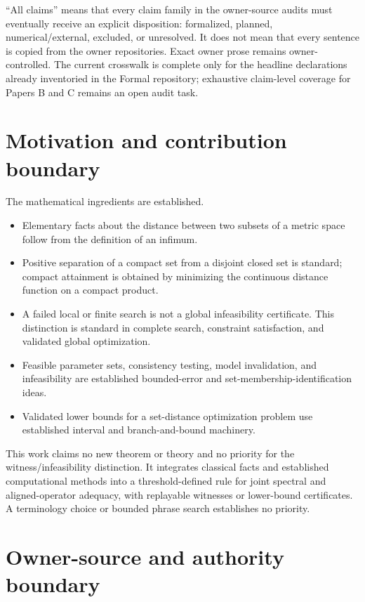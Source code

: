 \documentclass[11pt]{article}
\begin{document}
``All claims'' means that every claim family in the owner-source audits must eventually
receive an explicit disposition: formalized, planned, numerical/external, excluded, or
unresolved. It does not mean that every sentence is copied from the owner repositories.
Exact owner prose remains owner-controlled. The current crosswalk is complete only for
the headline declarations already inventoried in the Formal repository; exhaustive
claim-level coverage for Papers B and C remains an open audit task.

\section{Motivation and contribution boundary}

The mathematical ingredients are established.

\begin{itemize}
 \item Elementary facts about the distance between two subsets of a metric space follow
 from the definition of an infimum.
 \item Positive separation of a compact set from a disjoint closed set is standard;
 compact attainment is obtained by minimizing the continuous distance function on a
 compact product.
 \item A failed local or finite search is not a global infeasibility certificate. This
 distinction is standard in complete search, constraint satisfaction, and validated
 global optimization.
 \item Feasible parameter sets, consistency testing, model invalidation, and
 infeasibility are established bounded-error and set-membership-identification ideas.
 \item Validated lower bounds for a set-distance optimization problem use established
 interval and branch-and-bound machinery.
\end{itemize}

This work claims no new theorem or theory and no priority for the witness/infeasibility
distinction. It integrates classical facts and established computational methods into a
threshold-defined rule for joint spectral and aligned-operator adequacy, with replayable
witnesses or lower-bound certificates. A terminology choice or bounded phrase search
establishes no priority.

\section{Owner-source and authority boundary}
\end{document}
